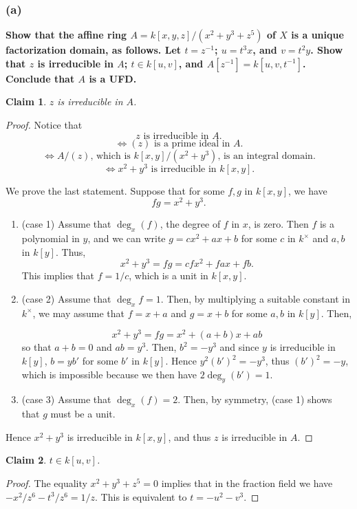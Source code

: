 \documentclass[11pt]{amsart}          %
\newtheorem*{claim}{Claim}
\begin{document}
\subsubsection*{(a)} \textbf{Show that the affine ring $A = k[x,y,z]/(x^2 + y^3 + z^5)$ of $X$ is a unique factorization domain, as follows. Let $t = z^{-1}$; $u = t^3 x$, and $v = t^2 y$. Show that $z$ is irreducible in $A$; $t \in k[u,v]$, and $A[z^{-1}] = k[u,v,t^{-1}]$. Conclude that $A$ is a UFD.  }
 \begin{claim} $z$ is irreducible in $A$.\end{claim} 
 \begin{proof}Notice that $$z \mbox{ is irreducible in } A.$$ $$\Leftrightarrow (z) \mbox{ is a prime ideal in } A.$$ $$\Leftrightarrow A/(z) \mbox{, which is } k[x,y]/ (x^2 + y^3) \mbox{, is an integral domain.} $$ $$ \Leftrightarrow x^2 + y^3 \mbox{ is irreducible in } k[x,y].$$ 

We prove the last statement. Suppose that for some $f, g$ in $k[x,y]$, we have
$$fg = x^2 + y^3.$$

\begin{enumerate}

\item (case 1) Assume that $\deg_x (f)$, the degree of $f$ in $x$, is zero. Then $f$ is a polynomial in $y$, and we can write $g = cx^2 + ax + b$ for some $c$ in $k^{\times}$ and $a, b $ in $k[y]$. Thus,
$$x^2 + y^3 = fg = cfx^2 + fa x + fb.$$ This implies that $f = 1/c$, which is a unit in $k[x,y]$.

\item (case 2) Assume that $\deg_x f = 1$. Then, by multiplying a suitable constant in $k^{\times}$, we may assume that $f = x + a$ and $g = x + b$ for some $a, b$ in $k[y]$. Then,

$$x^2 + y^3 = fg = x^2 + (a+b) x + ab$$ so that $a + b = 0$ and $ab = y^3$. Then, $b^2 = - y^3$ and since $y$ is irreducible in $k[y]$, $b = y b'$ for some $b'$ in $k[y]$. Hence $y^2 (b')^2 = - y^3$, thus $(b')^2 = -y$, which is impossible because we then have $2 \deg_y (b') = 1$.

\item (case 3) Assume that $\deg_x (f) = 2$. Then, by symmetry, (case 1) shows that $g$ must be a unit. 
\end{enumerate}

Hence $x^2 + y^3$ is irreducible in $k[x,y]$, and thus $z$ is irreducible in $A$.\end{proof}

\begin{claim} $t \in k[u,v]$.\end{claim}
\begin{proof} The equality $x^2 + y^3 + z^5 = 0$ implies that in the fraction field we have $- x^2 / z^6 - t^3/ z^6 = 1/z$. This is equivalent to $t = - u^2 - v^3.$\end{proof}
\end{document}
